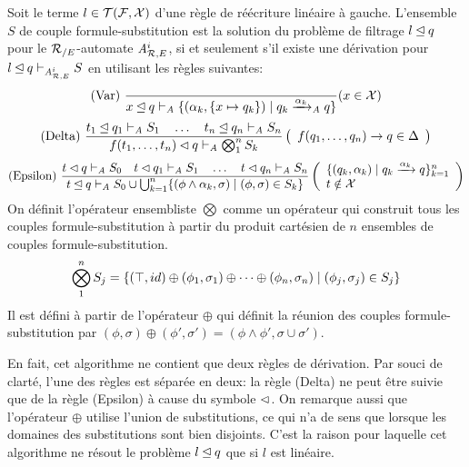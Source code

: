 \begin{definition}
  \label{def:matching-algorithm}
  Soit le terme $l \in \mathcal{T(F, X)}$ d'une règle de réécriture linéaire à gauche.
  L'ensemble $S$ de couple formule-substitution est la solution du problème de filtrage
  $l \unlhd q$ pour le ${\mathcal R_{/E}}$-automate ${\mathit A}_{\mathcal R,E}^i$, si et seulement s'il existe une dérivation pour 
  $l \unlhd q \vdash_{{\mathit A}_{\mathcal R,E}^i} S$ en utilisant les règles suivantes:
  {\footnotesize
    \[\textrm{(Var) }
    \dfrac{}
    {x \unlhd q \vdash_\mathit A \{(\alpha_k, \{x \mapsto q_k\}) \; | \; q_k \xrightarrow{\alpha_k}_\mathit A q\}}
    (x \in \mathcal X)
    \]
    \[\textrm{(Delta) }
    \dfrac{
      t_1 \unlhd q_1 \vdash_\mathit A S_1
      \quad \dots \quad
      t_n \unlhd q_n \vdash_\mathit A S_n
    }{f(t_1, \dots, t_n) \lhd q \vdash_\mathit A \bigotimes_1^n S_k
    }\left(
      \begin{array}{l}
        f(q_1, \dots, q_n) \rightarrow q \in \Delta\\
      \end{array}
    \right )
    \]
    \[\textrm{(Epsilon) }
    \dfrac{ 
      t \matchi q    \vdash_\A S_0   \quad
      t \matchi q_1 \vdash_\A S_1 \quad \dots \quad
      t \matchi q_n \vdash_\A S_n
    }{
      t \match q \vdash_\A S_0 \cup
      \bigcup_{k=1}^n \{(\phi \land \alpha_k, \sigma) \sep (\phi, \sigma) \in S_k\}
    }\left(
      \begin{array}{l}
        \{(q_k, \alpha_k) \sep q_k \xrw{\alpha_k} q\}_{k=1}^n\\%
        t \notin \X\\
      \end{array}
    \right)
    \]
  }
  On définit l'opérateur ensembliste $\bigotimes$ comme un opérateur qui
  construit tous les couples formule-substitution à partir du produit cartésien
  de $n$ ensembles de couples formule-substitution.
  \[\bigotimes_1^n S_j = \{ (\top, id) \oplus (\phi_1, \sigma_1) \oplus \dots \oplus (\phi_n, \sigma_n) \; | \; (\phi_j,\sigma_j) \in S_j\}\]
  Il est défini à partir de l'opérateur $\oplus$ qui définit la réunion des couples formule-substitution par
  $(\phi, \sigma) \oplus (\phi', \sigma') = (\phi \land \phi',\sigma \cup \sigma')$.
\end{definition}
En fait, cet algorithme ne contient que deux règles de dérivation. Par souci de clarté, l'une des règles est séparée en deux:
la règle (Delta) ne peut être suivie que de la règle (Epsilon) à cause du symbole $\lhd$. On remarque aussi que l'opérateur $\oplus$
utilise l'union de substitutions, ce qui n'a de sens que lorsque les domaines des substitutions sont bien disjoints. C'est la raison
pour laquelle cet algorithme ne résout le problème $l \unlhd q$ que si $l$ est linéaire.

